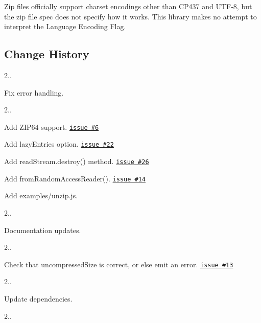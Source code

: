 Zip files officially support charset encodings other than C\+P437 and U\+T\+F-\/8, but the zip file spec does not specify how it works. This library makes no attempt to interpret the Language Encoding Flag.

\subsection*{Change History}


\begin{DoxyItemize}
\item 2..
\begin{DoxyItemize}
\item Fix error handling.
\end{DoxyItemize}
\item 2..
\begin{DoxyItemize}
\item Add Z\+I\+P64 support. \href{https://github.com/thejoshwolfe/yazl/issues/6}{\tt issue \#6}
\item Add {\ttfamily lazy\+Entries} option. \href{https://github.com/thejoshwolfe/yazl/issues/22}{\tt issue \#22}
\item Add {\ttfamily read\+Stream.\+destroy()} method. \href{https://github.com/thejoshwolfe/yazl/issues/26}{\tt issue \#26}
\item Add {\ttfamily from\+Random\+Access\+Reader()}. \href{https://github.com/thejoshwolfe/yazl/issues/14}{\tt issue \#14}
\item Add {\ttfamily examples/unzip.\+js}.
\end{DoxyItemize}
\item 2..
\begin{DoxyItemize}
\item Documentation updates.
\end{DoxyItemize}
\item 2..
\begin{DoxyItemize}
\item Check that {\ttfamily uncompressed\+Size} is correct, or else emit an error. \href{https://github.com/thejoshwolfe/yazl/issues/13}{\tt issue \#13}
\end{DoxyItemize}
\item 2..
\begin{DoxyItemize}
\item Update dependencies.
\end{DoxyItemize}
\item 2..
\begin{DoxyItemize}

\end{DoxyItemize}
\end{DoxyItemize}
